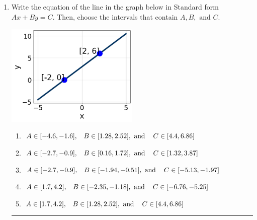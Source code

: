 \documentclass[14pt]{extbook}
\newcommand{\litem}[1]{\item#1\hspace*{-1cm}\rule{\textwidth}{0.4pt}}
\begin{document}
\begin{enumerate}
{\begin{enumerate}[label=\Alph*.]
\end{enumerate} }
\litem{
Write the equation of the line in the graph below in Standard form $Ax+By=C$. Then, choose the intervals that contain $A, B, \text{ and } C$.
\begin{center}
    \includegraphics[width=0.5\textwidth]{../Figures/linearGraphToStandardB.png}
\end{center}
\begin{enumerate}[label=\Alph*.]
\item \( A \in [-4.6, -1.6], \hspace{3mm} B \in [1.28, 2.52], \text{ and } \hspace{3mm} C \in [4.4, 6.86] \)
\item \( A \in [-2.7, -0.9], \hspace{3mm} B \in [0.16, 1.72], \text{ and } \hspace{3mm} C \in [1.32, 3.87] \)
\item \( A \in [-2.7, -0.9], \hspace{3mm} B \in [-1.94, -0.51], \text{ and } \hspace{3mm} C \in [-5.13, -1.97] \)
\item \( A \in [1.7, 4.2], \hspace{3mm} B \in [-2.35, -1.18], \text{ and } \hspace{3mm} C \in [-6.76, -5.25] \)
\item \( A \in [1.7, 4.2], \hspace{3mm} B \in [1.28, 2.52], \text{ and } \hspace{3mm} C \in [4.4, 6.86] \)

\end{enumerate} }
\end{enumerate}
\end{document}
